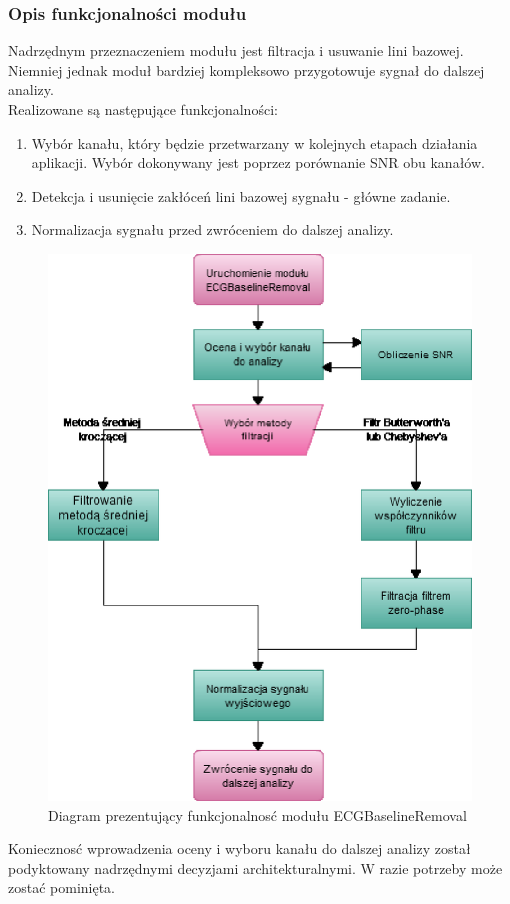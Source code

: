 \documentclass[a4paper, 11pt]{article}
\begin{document}
\subsubsection{Opis funkcjonalności modułu}
Nadrzędnym przeznaczeniem modułu jest filtracja i usuwanie lini bazowej. Niemniej jednak moduł bardziej kompleksowo przygotowuje sygnał do dalszej analizy.\\
Realizowane są następujące funkcjonalności:
\begin{enumerate}
\item Wybór kanału, który będzie przetwarzany w kolejnych etapach działania aplikacji. Wybór dokonywany jest poprzez porównanie SNR obu kanałów.
\item Detekcja i usunięcie zakłóceń lini bazowej sygnału - główne zadanie.
\item Normalizacja sygnału przed zwróceniem do dalszej analizy.
\end{enumerate}
\begin{figure}[h]
\centering
\includegraphics[scale=0.8]{include/baselineflow.eps}
\caption{Diagram prezentujący funkcjonalnosć modułu ECGBaselineRemoval}
\label{fig:fig_baselineflow}
\end{figure}
Koniecznosć wprowadzenia oceny i wyboru kanału do dalszej analizy został podyktowany nadrzędnymi decyzjami architekturalnymi. W razie potrzeby może zostać pominięta.\\
\end{document}
